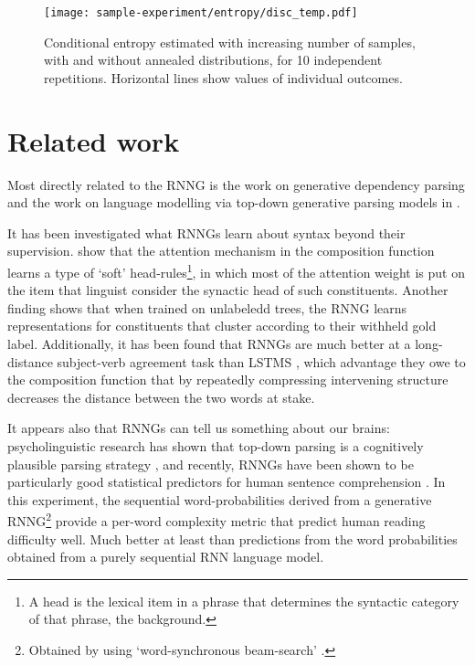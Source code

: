     \begin{figure}[h]
      \center
    	\texttt{[image: sample-experiment/entropy/disc\_temp.pdf]}
    \caption{Conditional entropy estimated with increasing number of samples, with and without annealed distributions, for 10 independent repetitions. Horizontal lines show values of individual outcomes.}
    \label{fig:samples-entropy}
    \end{figure}

\section{Related work}

    Most directly related to the RNNG is the work on generative dependency parsing \citep{titov2007generative,buys2015bayesian,buys2015generative,buys2018exact} and the work on language modelling via top-down generative parsing models in \citet{roark2001probabilistic}.

    It has been investigated what RNNGs learn about syntax beyond their supervision. \citet{kuncoro2017syntax} show that the attention mechanism in the composition function learns a type of `soft' head-rules\footnote{A head is the lexical item in a phrase that determines the syntactic category of that phrase, \cf the background.}, in which most of the attention weight is put on the item that linguist consider the synactic head of such constituents. Another finding shows that when trained on unlabeledd trees, the RNNG learns representations for constituents that cluster according to their withheld gold label. Additionally, it has been found that RNNGs are much better at a long-distance subject-verb agreement task than LSTMS \citep{linzen2016syntax,kuncoro2018learn}, which advantage they owe to the composition function that by repeatedly compressing intervening structure decreases the distance between the two words at stake.

    It appears also that RNNGs can tell us something about our brains: psycholinguistic research has shown that top-down parsing is a cognitively plausible parsing strategy \citep{brennan2016abstract}, and recently, RNNGs have been shown to be particularly good statistical predictors for human sentence comprehension \citep{hale2018beam}. In this experiment, the sequential word-probabilities derived from a generative RNNG\footnote{Obtained by using `word-synchronous beam-search' \citep{stern2017beam}.} provide a per-word complexity metric that predict human reading difficulty well. Much better at least than predictions from the word probabilities obtained from a purely sequential RNN language model.
